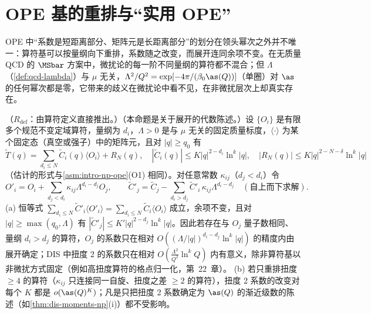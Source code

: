 \section{OPE 基的重排与“实用 OPE”}\label{sec:power-ope-basis}

OPE 中“系数是短距离部分、矩阵元是长距离部分”的划分在领头幂次之外并不唯一：算符基可以按量纲向下重排，系数随之改变，而展开连同余项不变。在无质量 QCD 的 $\MSbar$ 方案中，微扰论的每一阶不同量纲的算符都不混合；但 $\Lambda$（\cref{def:qcd-lambda}）与 $\mu$ 无关，$\Lambda^2/Q^2=\exp[-4\pi/(\beta_0\as(Q))]$（单圈）对 $\as$ 的任何幂次都是零，它带来的歧义在微扰论中看不见，在非微扰层次上却真实存在。

\begin{proposition}\label{prop:power-rearrangement}
（$R_{\mathrm{def}}$：由算符定义直接推出。）（本命题是关于展开的代数陈述。）设 $\{O_i\}$ 是有限多个规范不变定域算符，量纲为 $d_i$，$\Lambda>0$ 是与 $\mu$ 无关的固定质量标度，$\langle\cdot\rangle$ 为某个固定态（真空或强子）中的矩阵元，且对 $|q|\ge q_0$ 有
\begin{equation}\label{eq:power-ope-N}
\tilde T(q)=\sum_{d_i\le N}\tilde C_i(q)\langle O_i\rangle+R_N(q),\quad
|\tilde C_i(q)|\le K|q|^{2-d_i}\ln^k|q|,\quad |R_N(q)|\le K|q|^{2-N-\delta}\ln^k|q|
\end{equation}
（估计的形式与\cref{asm:intro-np-ope}(O1) 相同）。对任意常数 $\kappa_{ij}$（$d_j<d_i$）令
\begin{equation}\label{eq:power-rearr}
O'_i=O_i+\sum_{d_j<d_i}\kappa_{ij}\Lambda^{d_i-d_j}O_j,\qquad
\tilde C'_j=\tilde C_j-\sum_{d_i>d_j}\tilde C'_i\,\kappa_{ij}\Lambda^{d_i-d_j}\quad(\text{自上而下求解}).
\end{equation}
(a) 恒等式 $\sum_{d_i\le N}\tilde C'_i\langle O'_i\rangle=\sum_{d_i\le N}\tilde C_i\langle O_i\rangle$ 成立，余项不变，且对 $|q|\ge\max(q_0,\Lambda)$ 有 $|\tilde C'_j|\le K'|q|^{2-d_j}\ln^k|q|$。因此若存在与 $O_j$ 量子数相同、量纲 $d_i>d_j$ 的算符，$O_j$ 的系数只在相对 $O((\Lambda/|q|)^{d_i-d_j}\ln^k|q|)$ 的精度内由展开确定；DIS 中扭度 2 的系数只在相对 $O(\frac{\Lambda^2}{Q^2}\ln^kQ)$ 内有意义，除非算符基以非微扰方式固定（例如高扭度算符的格点归一化，第~22~章）。
(b) 若只重排扭度 $\ge4$ 的算符（$\kappa_{ij}$ 只连接同一自旋、扭度之差 $\ge2$ 的算符），扭度 2 系数的改变对每个 $K$ 都是 $o(\as(Q)^K)$；凡是只把扭度 2 系数确定为 $\as(Q)$ 的渐近级数的陈述（如\cref{thm:dis-moments-np}(i)）都不受影响。
\end{proposition}

